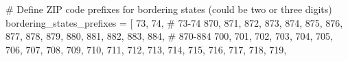 \documentclass[
  letterpaper,
  DIV=11,
  numbers=noendperiod]{scrartcl}
\newenvironment{Shaded}{\begin{snugshade}}{\end{snugshade}}
\newcommand{\CommentTok}[1]{\textcolor[rgb]{0.37,0.37,0.37}{#1}}
\newcommand{\NormalTok}[1]{\textcolor[rgb]{0.00,0.23,0.31}{#1}}
\newcommand{\OperatorTok}[1]{\textcolor[rgb]{0.37,0.37,0.37}{#1}}
\newcommand{\StringTok}[1]{\textcolor[rgb]{0.13,0.47,0.30}{#1}}
\begin{document}
\begin{Shaded}
\begin{Highlighting}[]
\CommentTok{\# Define ZIP code prefixes for bordering states (could be two or three digits)}
\NormalTok{bordering\_states\_prefixes }\OperatorTok{=}\NormalTok{ [}
    \StringTok{\textquotesingle{}73\textquotesingle{}}\NormalTok{, }\StringTok{\textquotesingle{}74\textquotesingle{}}\NormalTok{,       }\CommentTok{\# 73{-}74 }
    \StringTok{\textquotesingle{}870\textquotesingle{}}\NormalTok{, }\StringTok{\textquotesingle{}871\textquotesingle{}}\NormalTok{, }\StringTok{\textquotesingle{}872\textquotesingle{}}\NormalTok{, }\StringTok{\textquotesingle{}873\textquotesingle{}}\NormalTok{, }\StringTok{\textquotesingle{}874\textquotesingle{}}\NormalTok{, }\StringTok{\textquotesingle{}875\textquotesingle{}}\NormalTok{, }\StringTok{\textquotesingle{}876\textquotesingle{}}\NormalTok{, }\StringTok{\textquotesingle{}877\textquotesingle{}}\NormalTok{, }\StringTok{\textquotesingle{}878\textquotesingle{}}\NormalTok{, }\StringTok{\textquotesingle{}879\textquotesingle{}}\NormalTok{,}
\StringTok{\textquotesingle{}880\textquotesingle{}}\NormalTok{, }\StringTok{\textquotesingle{}881\textquotesingle{}}\NormalTok{, }\StringTok{\textquotesingle{}882\textquotesingle{}}\NormalTok{, }\StringTok{\textquotesingle{}883\textquotesingle{}}\NormalTok{, }\StringTok{\textquotesingle{}884\textquotesingle{}}\NormalTok{,  }\CommentTok{\# 870{-}884}
    \StringTok{\textquotesingle{}700\textquotesingle{}}\NormalTok{, }\StringTok{\textquotesingle{}701\textquotesingle{}}\NormalTok{, }\StringTok{\textquotesingle{}702\textquotesingle{}}\NormalTok{, }\StringTok{\textquotesingle{}703\textquotesingle{}}\NormalTok{, }\StringTok{\textquotesingle{}704\textquotesingle{}}\NormalTok{, }\StringTok{\textquotesingle{}705\textquotesingle{}}\NormalTok{, }\StringTok{\textquotesingle{}706\textquotesingle{}}\NormalTok{, }\StringTok{\textquotesingle{}707\textquotesingle{}}\NormalTok{, }\StringTok{\textquotesingle{}708\textquotesingle{}}\NormalTok{, }\StringTok{\textquotesingle{}709\textquotesingle{}}\NormalTok{,}
\StringTok{\textquotesingle{}710\textquotesingle{}}\NormalTok{, }\StringTok{\textquotesingle{}711\textquotesingle{}}\NormalTok{, }\StringTok{\textquotesingle{}712\textquotesingle{}}\NormalTok{, }\StringTok{\textquotesingle{}713\textquotesingle{}}\NormalTok{, }\StringTok{\textquotesingle{}714\textquotesingle{}}\NormalTok{, }\StringTok{\textquotesingle{}715\textquotesingle{}}\NormalTok{, }\StringTok{\textquotesingle{}716\textquotesingle{}}\NormalTok{, }\StringTok{\textquotesingle{}717\textquotesingle{}}\NormalTok{, }\StringTok{\textquotesingle{}718\textquotesingle{}}\NormalTok{, }\StringTok{\textquotesingle{}719\textquotesingle{}}\NormalTok{,}

\end{Highlighting}
\end{Shaded}
\end{document}
